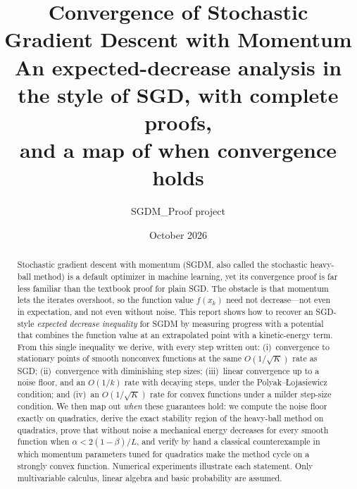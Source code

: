 \documentclass[11pt]{article}
\title{\textbf{Convergence of Stochastic Gradient Descent with Momentum}\\[4pt]
  \large An expected-decrease analysis in the style of SGD, with complete proofs,\\
  and a map of when convergence holds}
\author{SGDM\_Proof project}
\date{October 2026}
\numberwithin{equation}{section}
\theoremstyle{plain}
\theoremstyle{definition}
\theoremstyle{remark}
\begin{document}
\maketitle

\begin{abstract}
\noindent
Stochastic gradient descent with momentum (SGDM, also called the stochastic heavy-ball
method) is a default optimizer in machine learning, yet its convergence proof is far less
familiar than the textbook proof for plain SGD. The obstacle is that momentum lets the
iterates overshoot, so the function value $f(x_k)$ need not decrease---not even in
expectation, and not even without noise. This report shows how to recover an SGD-style
\emph{expected decrease inequality} for SGDM by measuring progress with a
potential that combines the function value at an extrapolated point with a kinetic-energy
term. From this single inequality we derive, with every step written out:
(i)~convergence to stationary points of smooth nonconvex functions at the same
$O(1/\sqrt{K})$ rate as SGD; (ii)~convergence with diminishing step sizes; (iii)~linear
convergence up to a noise floor, and an $O(1/k)$ rate with decaying steps, under the
Polyak--{\L}ojasiewicz condition; and (iv)~an $O(1/\sqrt{K})$ rate for convex functions
under a milder step-size condition. We then map out \emph{when} these guarantees hold: we
compute the noise floor exactly on quadratics, derive the exact stability region of the
heavy-ball method on quadratics, prove that without noise a mechanical energy decreases for
every smooth function when $\alpha<2(1-\beta)/L$, and verify by hand a classical
counterexample in which momentum parameters tuned for quadratics make the method cycle on a
strongly convex function. Numerical experiments illustrate each statement. Only
multivariable calculus, linear algebra and basic probability are assumed.
\end{abstract}

\newpage
{\small\setlength{\parskip}{0pt}\tableofcontents}
\newpage











\appendix



\end{document}

